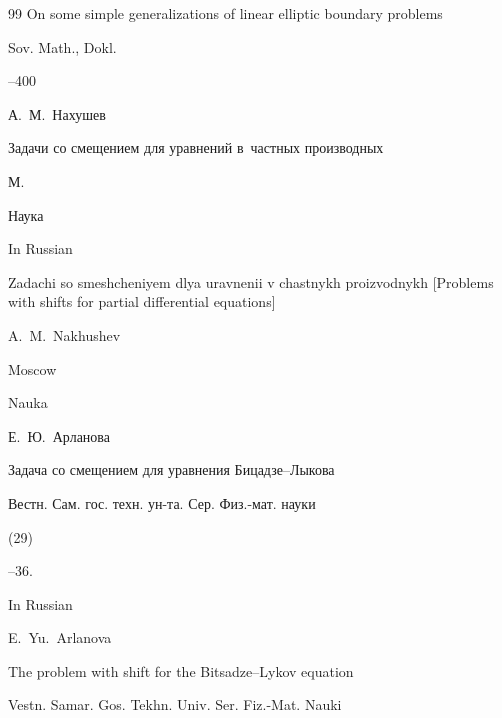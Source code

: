 \begin{thebibliography}{99}
\paper On some simple generalizations of linear elliptic boundary problems

\jour Sov. Math., Dokl. 



--400 







\by А.~М.~Нахушев

\book Задачи со смещением для уравнений в~частных производных

\publaddr М.

\publ Наука




\misctransl

\lang In Russian

\book Zadachi so smeshcheniyem dlya uravnenii v chastnykh proizvodnykh \rm [Problems with shifts for partial differential equations]

\by A.~M.~Nakhushev

\publaddr Moscow

\publ Nauka










\by Е.~Ю.~Арланова

\paper Задача со смещением для уравнения Бицадзе--Лыкова

\jour Вестн. Сам. гос. техн. ун-та. Сер. Физ.-мат. науки


(29)

--36.



\misctransl

\lang In Russian

\by E.~Yu.~Arlanova

\paper The problem with shift for the Bitsadze--Lykov equation

\jour Vestn. Samar. Gos. Tekhn. Univ. Ser. Fiz.-Mat. Nauki


\end{thebibliography}
